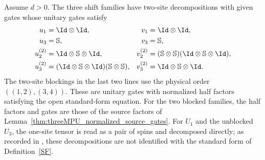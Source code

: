 \begin{lemma}
    \label{thm:threeMPU_supplied_decompositions}
    \leanok
    Assume $d>0$. The three shift families have two-site decompositions
    with given gates whose unitary gates satisfy
    \begin{align}
        u_1                          & =\Id\otimes\Id,                  & v_1 & =\Id\otimes\Id, \\
        u_3                          & =\mathbb S,                      & v_3 & =\mathbb S,     \\
        u_2^{(2)}                    & =\Id\otimes\mathbb S\otimes\Id,  &
        v_2^{(2)}                    & =(\mathbb S\otimes\mathbb S)
        (\Id\otimes\mathbb S\otimes\Id),                                                        \\
        u_3^{(2)}                    & =(\Id\otimes\mathbb S\otimes\Id)
        (\mathbb S\otimes\mathbb S), &
        v_3^{(2)}                    & =\Id\otimes\mathbb S\otimes\Id.
    \end{align}
    The two-site blockings in the last two lines use the physical order
    $((1,2),(3,4))$. These are unitary gates with normalized half factors
    satisfying the open standard-form equation. For the two blocked families,
    the half factors and gates are those of the source factors of
    Lemma~\ref{thm:threeMPU_normalized_source_gates}. For $U_1$ and the
    unblocked $U_3$, the one-site tensor is read as a pair of spins and
    decomposed directly; as recorded in \cite{gap:mpu_shift_supplied_standard_forms}, these decompositions are not identified with the
    standard form of
    Definition~\ref{SF}.
\end{lemma}

